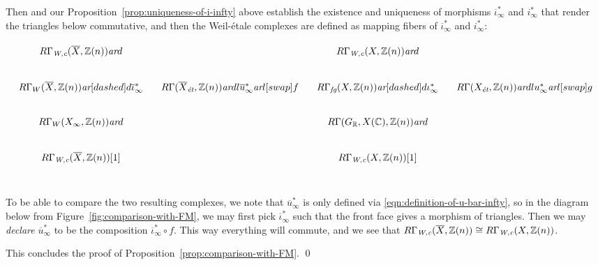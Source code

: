 \documentclass[leqno,12pt]{article}
\theoremstyle{plain}
\theoremstyle{definition}
\newcommand{\CC}{\mathbb{C}}
\newcommand{\RR}{\mathbb{R}}
\newcommand{\ZZ}{\mathbb{Z}}
\newcommand{\Wc}{\text{\it W,c}}
\newcommand{\ar}{\text{\it ar}}
\newcommand{\et}{\text{\it \'{e}t}}
\newcommand{\fg}{\text{\it fg}}
\begin{document}
Then \cite[Proposition~3.24]{Flach-Morin-2018} and our
Proposition~\ref{prop:uniqueness-of-i-infty} above establish the existence and
uniqueness of morphisms $\overline{\iota}_\infty^*$ and $i_\infty^*$ that render
the triangles below commutative, and then the Weil-\'{e}tale complexes are defined
as mapping fibers of $\overline{\iota}_\infty^*$ and $i_\infty^*$:

\[ \begin{tikzcd}[column sep=1em]
    R\Gamma_\Wc (\overline{X}, \ZZ (n))\ar{d} & & R\Gamma_\Wc (X, \ZZ (n))\ar{d} \\
    R\Gamma_W (\overline{X}, \ZZ(n)) \ar[dashed]{d}{\overline{\iota}_\infty^*} & R\Gamma (\overline{X}_\et, \ZZ(n)) \ar{dl}{\overline{u}_\infty^*}\ar{l}[swap]{f} & R\Gamma_\fg (X, \ZZ(n))  \ar[dashed]{d}{\iota_\infty^*} & R\Gamma (X_\et, \ZZ(n)) \ar{dl}{u_\infty^*}\ar{l}[swap]{g} \\
    R\Gamma_W (X_\infty, \ZZ (n))\ar{d} & & R\Gamma (G_\RR, X (\CC), \ZZ (n))\ar{d} \\
    R\Gamma_\Wc (\overline{X}, \ZZ (n))[1] & & R\Gamma_\Wc (X, \ZZ (n))[1] \\
  \end{tikzcd} \]

To be able to compare the two resulting complexes, we note that
$\overline{u}_\infty^*$ is only defined via
\eqref{eqn:definition-of-u-bar-infty}, so in the diagram below from
Figure~\ref{fig:comparison-with-FM}, we may first pick
$\overline{\iota}_\infty^*$ such that the front face gives a morphism of
triangles. Then we may \emph{declare} $\overline{u}_\infty^*$ to be the
composition $\overline{\iota}_\infty^* \circ f$. This way everything will
commute, and we see that
$R\Gamma_\Wc (\overline{X}, \ZZ(n)) \cong R\Gamma_\Wc (X, \ZZ(n))$.

\vspace{1em}

This concludes the proof of Proposition~\ref{prop:comparison-with-FM}. \qed
\end{document}
